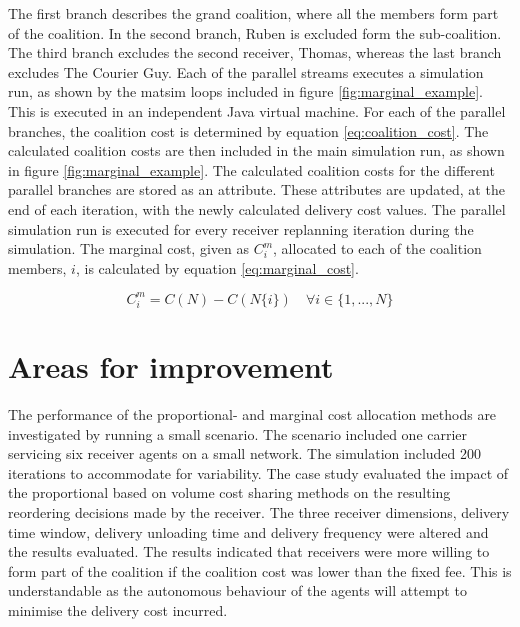 The first branch describes the grand coalition, where all the members form part of the coalition. In the second branch, Ruben is excluded form the sub-coalition. The third branch excludes the second receiver, Thomas, whereas the last branch excludes The Courier Guy. Each of the parallel streams executes a simulation run, as shown by the \acrshort{matsim} loops included in figure \ref{fig:marginal_example}. This is executed in an independent Java virtual machine. For each of the parallel branches, the coalition cost is determined by equation \ref{eq:coalition_cost}. The calculated coalition costs are then included in the main simulation run, as shown in figure \ref{fig:marginal_example}. The calculated coalition costs for the different parallel branches are stored as an attribute. These attributes are updated, at the end of each iteration, with the newly calculated delivery cost values.
The parallel simulation run is executed for every receiver replanning iteration during the simulation. The marginal cost, given as \(C_i^m\), allocated to each of the coalition members, \(i\), is calculated by equation \ref{eq:marginal_cost}. 

\begin{equation}
\label{eq:marginal_cost}
    C_i^ m = C(N) - C( N\{i\}) \quad \forall i \in \{1,...,N\}
\end{equation}

\section{Areas for improvement}

The performance of the proportional- and marginal cost allocation methods are investigated by running a small scenario. The scenario included one carrier servicing six receiver agents on a small network. The simulation included 200 iterations to accommodate for variability. The case study evaluated the impact of the proportional based on volume cost sharing methods on the resulting reordering decisions made by the receiver. The three receiver dimensions, delivery time window, delivery unloading time and delivery frequency were altered and the results evaluated. The results indicated that receivers were more willing to form part of the coalition if the coalition cost was lower than the fixed fee. This is understandable as the autonomous behaviour of the agents will attempt to minimise the delivery cost incurred. \par

